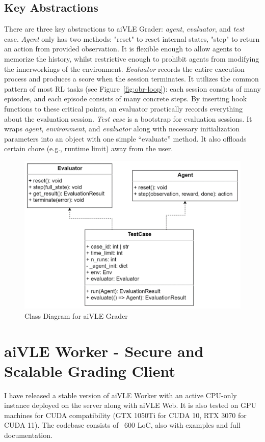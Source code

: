 \documentclass[fyp]{socreport}
\begin{document}
\subsection{Key Abstractions}
There are three key abstractions to aiVLE Grader: \textit{agent}, \textit{evaluator}, and \textit{test} case.
\textit{Agent} only has two methods: "reset" to reset internal states, "step" to return an action from provided observation. It is flexible enough to allow agents to memorize the history, whilst restrictive enough to prohibit agents from modifying the innerworkings of the environment.
\textit{Evaluator} records the entire execution process and produces a score when the session terminates. It utilizes the common pattern of most RL tasks (see Figure~\ref{fig:obr-loop}): each session consists of many episodes, and each episode consists of many concrete steps. By inserting hook functions to these critical points, an evaluator practically records everything about the evaluation session. 
\textit{Test case} is a bootstrap for evaluation sessions. It wraps \textit{agent}, \textit{environment}, and \textit{evaluator} along with necessary initialization parameters into an object with one simple “evaluate” method. It also offloads certain chore (e.g., runtime limit) away from the user.
\begin{figure}[H]
    \centering
    \includegraphics{images/aivle-grader-class.png}
    \caption{Class Diagram for aiVLE Grader}
    \label{fig:aivle-grader-class}
\end{figure}

\section{aiVLE Worker - Secure and Scalable Grading Client}
\label{ch:aivle-worker}
I have released a stable version of aiVLE Worker with an active CPU-only instance deployed on the server along with aiVLE Web. It is also tested on GPU machines for CUDA compatibility (GTX 1050Ti for CUDA 10, RTX 3070 for CUDA 11). The codebase consists of ~600 LoC, also with examples and full documentation.
\end{document}
